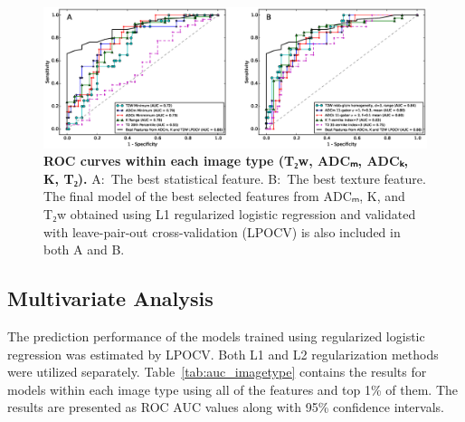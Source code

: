 \begin{figure}[!ht]
    \centering
    \includegraphics[width=1.0\textwidth]{figures/fig4}
    \caption{{\bf ROC curves within each image type (T₂w, ADCₘ, ADCₖ, K, T₂).}
    A:~The best statistical feature. B:~The best texture feature. The final
    model of the best selected features from ADCₘ, K, and T₂w obtained using L1
    regularized logistic regression and validated with leave-pair-out
    cross-validation (LPOCV) is also included in both A and B.}%
    \label{fig:roc}
\end{figure}


\subsection{Multivariate Analysis}

The prediction performance of the models trained using regularized logistic
regression was estimated by LPOCV\@. Both L1 and L2 regularization methods were
utilized separately. Table~\ref{tab:auc_imagetype} contains the results for
models within each image type using all of the features and top 1\% of them. The
results are presented as ROC AUC values along with 95\% confidence intervals.

